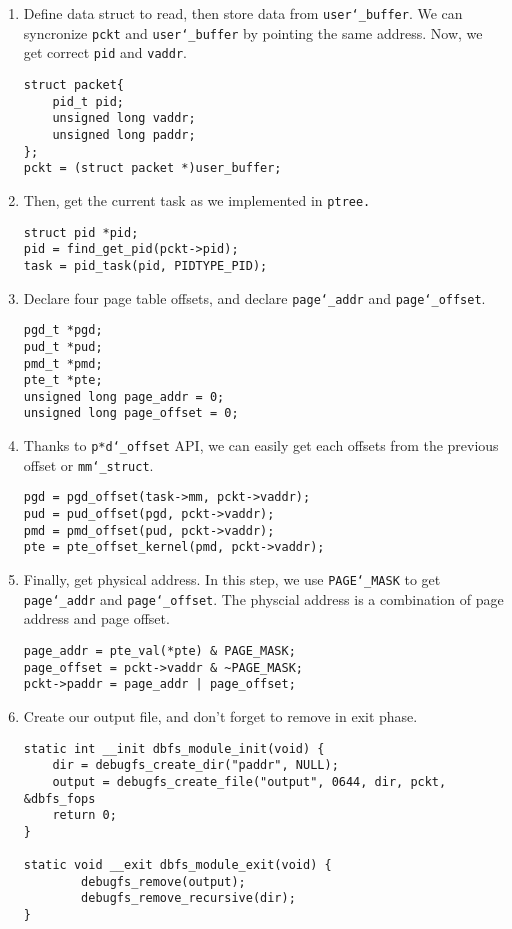 \begin{enumerate}
\item Define data struct to read, then store data from \texttt{user\char`_buffer}.
We can syncronize \texttt{pckt} and \texttt{user\char`_buffer} by pointing the same address.
Now, we get correct \texttt{pid} and \texttt{vaddr}.
\begin{lstlisting}
struct packet{
    pid_t pid;
    unsigned long vaddr;
    unsigned long paddr;
};
pckt = (struct packet *)user_buffer;
\end{lstlisting}

\item Then, get the current task as we implemented in \texttt{ptree.}
\begin{lstlisting}
struct pid *pid;
pid = find_get_pid(pckt->pid);
task = pid_task(pid, PIDTYPE_PID);
\end{lstlisting}

\item Declare four page table offsets, and declare \texttt{page\char`_addr} and \texttt{page\char`_offset}.
\begin{lstlisting}
pgd_t *pgd;
pud_t *pud;
pmd_t *pmd;
pte_t *pte;
unsigned long page_addr = 0;
unsigned long page_offset = 0;
\end{lstlisting}

\item Thanks to \texttt{p*d\char`_offset} API, we can easily get each offsets from the previous offset or \texttt{mm\char`_struct}.
\begin{lstlisting}
pgd = pgd_offset(task->mm, pckt->vaddr);
pud = pud_offset(pgd, pckt->vaddr);
pmd = pmd_offset(pud, pckt->vaddr);
pte = pte_offset_kernel(pmd, pckt->vaddr);
\end{lstlisting}

\item Finally, get physical address.
In this step, we use \texttt{PAGE\char`_MASK} to get \texttt{page\char`_addr} and \texttt{page\char`_offset}.
The physcial address is a combination of page address and page offset.
\begin{lstlisting}
page_addr = pte_val(*pte) & PAGE_MASK;
page_offset = pckt->vaddr & ~PAGE_MASK;
pckt->paddr = page_addr | page_offset;
\end{lstlisting}

\item Create our output file, and don't forget to remove in exit phase.
\begin{lstlisting}
static int __init dbfs_module_init(void) {
    dir = debugfs_create_dir("paddr", NULL);
    output = debugfs_create_file("output", 0644, dir, pckt, &dbfs_fops
    return 0;
}

static void __exit dbfs_module_exit(void) {
		debugfs_remove(output);
		debugfs_remove_recursive(dir);
}

\end{lstlisting}


\end{enumerate}